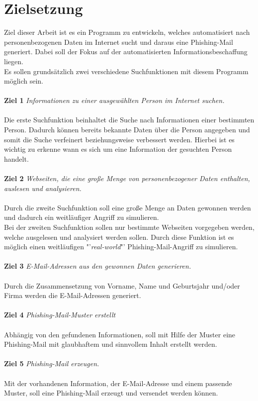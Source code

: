 \section{Zielsetzung}
\label {sec:Zielsetzung}
 Ziel dieser Arbeit ist es ein Programm zu entwickeln, welches automatisiert nach personenbezogenen Daten im Internet sucht und daraus eine Phishing-Mail generiert. Dabei soll der Fokus auf der automatisierten Informationsbeschaffung liegen.\\ 
 Es sollen grundsätzlich zwei verschiedene Suchfunktionen mit diesem Programm möglich sein. \\\\
 {\bf Ziel 1} \textit{Informationen zu einer ausgewählten Person im Internet suchen.}\\\\
 Die erste Suchfunktion beinhaltet die Suche nach Informationen einer bestimmten Person. Dadurch können bereits bekannte Daten über die Person angegeben und somit die Suche verfeinert beziehungsweise verbessert werden. Hierbei ist es wichtig zu erkenne wann es sich um eine Information der gesuchten Person handelt.\\\\
 {\bf Ziel 2} \textit{Webseiten, die eine große Menge von personenbezogener Daten enthalten, auslesen und analysieren.}\\\\
 Durch die zweite Suchfunktion soll eine große Menge an Daten gewonnen werden und dadurch ein weitläufiger Angriff zu simulieren.\\
 Bei der zweiten Suchfunktion sollen nur bestimmte Webseiten vorgegeben werden, welche ausgelesen und analysiert werden sollen. Durch diese Funktion ist es möglich einen weitläufigen "'\textit{real-world}"' Phishing-Mail-Angriff zu simulieren.\\\\
 {\bf Ziel 3} \textit{E-Mail-Adressen aus den gewonnen Daten generieren.}\\\\
 Durch die Zusammensetzung von Vorname, Name und Geburtsjahr und/oder Firma werden die E-Mail-Adressen generiert.\\\\
 {\bf Ziel 4} \textit{Phishing-Mail-Muster erstellt}\\\\
 Abhängig von den gefundenen Informationen, soll mit Hilfe der Muster eine Phishing-Mail mit glaubhaftem und sinnvollem Inhalt erstellt werden.\\\\
 {\bf Ziel 5} \textit{Phishing-Mail erzeugen.}\\\\
 Mit der vorhandenen Information, der E-Mail-Adresse und einem passende Muster, soll eine Phishing-Mail erzeugt und versendet werden können.
 
